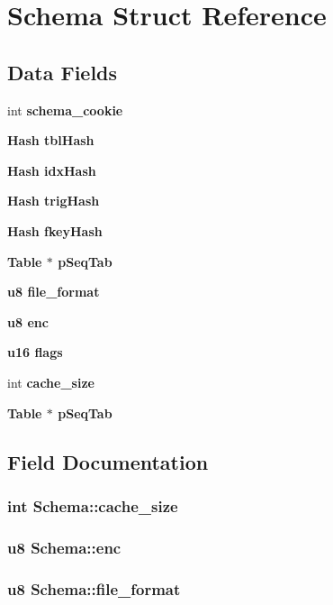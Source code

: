 \section{Schema Struct Reference}
\label{structSchema}
\subsection*{Data Fields}
\begin{CompactItemize}
\item 
int \bf{schema\_\-cookie}
\item 
\bf{Hash} \bf{tbl\-Hash}
\item 
\bf{Hash} \bf{idx\-Hash}
\item 
\bf{Hash} \bf{trig\-Hash}
\item 
\bf{Hash} \bf{fkey\-Hash}
\item 
\bf{Table} $\ast$ \bf{p\-Seq\-Tab}
\item 
\bf{u8} \bf{file\_\-format}
\item 
\bf{u8} \bf{enc}
\item 
\bf{u16} \bf{flags}
\item 
int \bf{cache\_\-size}
\item 
\bf{Table} $\ast$ \bf{p\-Seq\-Tab}
\end{CompactItemize}


\subsection{Field Documentation}
\subsubsection{\setlength{\rightskip}{0pt plus 5cm}int \bf{Schema::cache\_\-size}}\label{structSchema_50a04b7612273239f9822c024b4d387e}


\subsubsection{\setlength{\rightskip}{0pt plus 5cm}\bf{u8} \bf{Schema::enc}}\label{structSchema_7879e8d12ead2e05140d59b78b18d16f}


\subsubsection{\setlength{\rightskip}{0pt plus 5cm}\bf{u8} \bf{Schema::file\_\-format}}\label{structSchema_5defd1dc766ac6b00f9fc3e5ab203b61}


